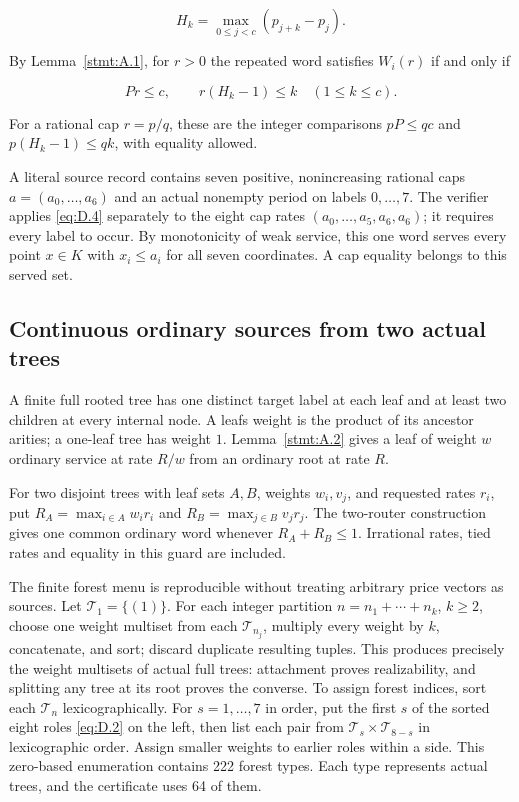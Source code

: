 \documentclass[11pt,a4paper]{article}
\begin{document}
\begin{equation}
H_k=\max_{0\le j<c}(p_{j+k}-p_j).
\tag{D.3}\label{eq:D.3}
\end{equation}

By Lemma~\ref{stmt:A.1}, for \(r>0\) the repeated word satisfies \(W_i(r)\) if and only if

\begin{equation}
Pr\le c,\qquad r(H_k-1)\le k\quad(1\le k\le c).
\tag{D.4}\label{eq:D.4}
\end{equation}

For a rational cap \(r=p/q\), these are the integer comparisons \(pP\le qc\) and \(p(H_k-1)\le qk\), with equality allowed.

A literal source record contains seven positive, nonincreasing rational caps \(a=(a_0,\ldots,a_6)\) and an actual nonempty period on labels \(0,\ldots,7\). The verifier applies \eqref{eq:D.4} separately to the eight cap rates \((a_0,\ldots,a_5,a_6,a_6)\); it requires every label to occur. By monotonicity of weak service, this one word serves every point \(x\in K\) with \(x_i\le a_i\) for all seven coordinates. A cap equality belongs to this served set.

\subsection{Continuous ordinary sources from two actual trees}\label{sec:D.2}

A finite full rooted tree has one distinct target label at each leaf and at least two children at every internal node. A leaf\textquotesingle s weight is the product of its ancestor arities; a one-leaf tree has weight \(1\). Lemma~\ref{stmt:A.2} gives a leaf of weight \(w\) ordinary service at rate \(R/w\) from an ordinary root at rate \(R\).

For two disjoint trees with leaf sets \(A,B\), weights \(w_i,v_j\), and requested rates \(r_i\), put \(R_A=\max_{i\in A}w_ir_i\) and \(R_B=\max_{j\in B}v_jr_j\). The two-router construction gives one common ordinary word whenever \(R_A+R_B\le1\). Irrational rates, tied rates and equality in this guard are included.

The finite forest menu is reproducible without treating arbitrary price vectors as sources. Let \(\mathcal T_1=\{(1)\}\). For each integer partition \(n=n_1+\cdots+n_k\), \(k\ge2\), choose one weight multiset from each \(\mathcal T_{n_j}\), multiply every weight by \(k\), concatenate, and sort; discard duplicate resulting tuples. This produces precisely the weight multisets of actual full trees: attachment proves realizability, and splitting any tree at its root proves the converse. To assign forest indices, sort each \(\mathcal T_n\) lexicographically. For \(s=1,\ldots,7\) in order, put the first \(s\) of the sorted eight roles \eqref{eq:D.2} on the left, then list each pair from \(\mathcal T_s\times\mathcal T_{8-s}\) in lexicographic order. Assign smaller weights to earlier roles within a side. This zero-based enumeration contains 222 forest types. Each type represents actual trees, and the certificate uses 64 of them.
\end{document}
